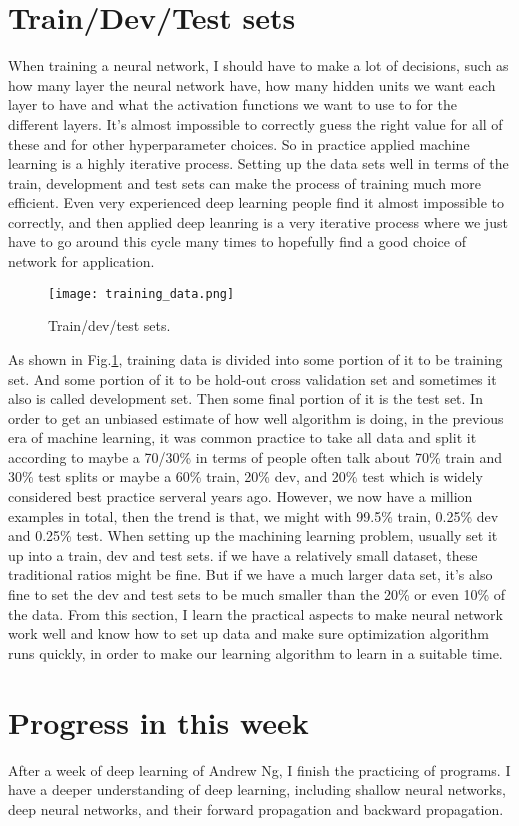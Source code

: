 \documentclass[a4paper]{article}
\begin{document}
\section{Train/Dev/Test sets}
When training a neural network, I should have to make a lot of decisions,
such as how many layer the neural network have, how many hidden units we want each layer to have and what the activation functions we want to use to for the different layers. It's almost impossible to correctly guess the right value for all of these and for other hyperparameter choices. So in practice applied machine learning is a highly iterative process.
Setting up the data sets well in terms of the train, development and test sets can make the process of training much more efficient. 
Even very experienced deep learning people find it almost impossible to
correctly, and then applied deep leanring is a very iterative process where we just have to go around this
cycle many times to hopefully find a good choice of network for application.
%
\begin{figure}[ht]
	\centering
	\texttt{[image: training\_data.png]}
	\caption{Train/dev/test sets.}
	\label{training_data}
\end{figure}
%
 As shown in Fig.\ref{training_data}, training data is divided into some portion of it to be training set. And some portion of it to be hold-out cross validation set and sometimes it also is called development set. Then some final portion of it is the test
set. In order to get an unbiased estimate of how well algorithm is doing, in the previous era of machine learning, it was common
practice to take all data and split it according to maybe a 70/30\% in terms of people often talk about
70\% train and 30\% test splits or maybe a 60\% train, 20\% dev, and 20\% test which is widely considered
best practice serveral years ago. However, we now have a million examples in total, then the trend is that, we might with 99.5\% train, 0.25\% dev and 0.25\% test. When setting up the machining learning problem, usually set it up into a train, dev and test sets. if we have a
relatively small dataset, these traditional ratios might be fine. But if we have a much larger data set, it's also fine to set the dev and test sets to be much smaller than the 20\% or even 10\% of the data. From this section, I learn the practical aspects to make neural network work well and know  how to set up data and make sure optimization algorithm runs quickly, in order to make our learning algorithm to learn in a suitable time. 
\section{Progress in this week}
After a week of deep learning of Andrew Ng, I finish the practicing of programs. I have a deeper understanding of deep learning, including shallow neural networks, deep neural networks, and their forward propagation and backward propagation.
\end{document}
